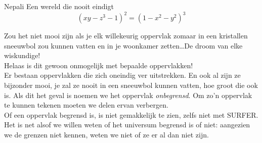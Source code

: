 \begin{surferPage}{Nepali}
Een wereld die nooit eindigt \\

\smallskip
\[(x y - z^3 -1)^2= (1 - x^2 - y^2)^3\]

\singlespacing
Zou het niet mooi zijn als je elk willekeurig oppervlak zomaar in een kristallen sneeuwbol zou kunnen vatten en in je woonkamer zetten\dots De droom van elke wiskundige!
\\
Helaas is dit gewoon onmogelijk met bepaalde oppervlakken!
\\
\singlespacing
Er bestaan oppervlakken die zich oneindig ver uitstrekken. En ook al zijn ze bijzonder mooi, je zal ze nooit in een sneeuwbol kunnen vatten, hoe groot die ook is. Als dit het geval is noemen we het oppervlak \textit{onbegrensd}. Om zo'n oppervlak te kunnen tekenen moeten we delen ervan verbergen.
\\
\singlespacing
Of een oppervlak begrensd is, is niet gemakkelijk te zien, zelfs niet met SURFER. Het is net alsof we willen weten of het universum begrensd is of niet: aangezien we de grenzen niet kennen, weten we niet of ze er al dan niet zijn.
\end{surferPage}
